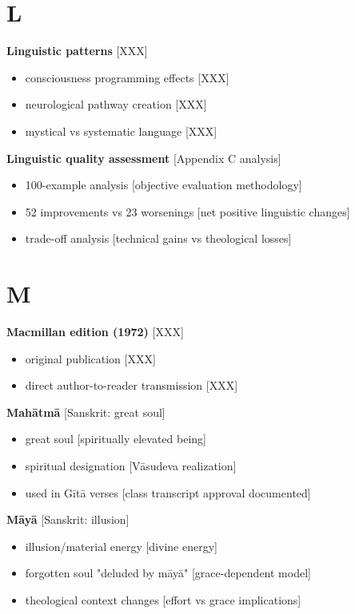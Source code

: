 \documentclass[11pt,twoside]{book}
\begin{document}
\section*{L}
\label{sec:orgada353a}

\textbf{\textbf{Linguistic patterns}} {[}XXX]
\begin{itemize}
\item consciousness programming effects [XXX]
\item neurological pathway creation [XXX]
\item mystical vs systematic language [XXX]
\end{itemize}

\textbf{\textbf{Linguistic quality assessment}} {[}Appendix C analysis]
\begin{itemize}
\item 100-example analysis [objective evaluation methodology]
\item 52 improvements vs 23 worsenings [net positive linguistic changes]
\item trade-off analysis [technical gains vs theological losses]
\end{itemize}
\section*{M}
\label{sec:org7b248fb}

\textbf{\textbf{Macmillan edition (1972)}} {[}XXX]
\begin{itemize}
\item original publication [XXX]
\item direct author-to-reader transmission [XXX]
\end{itemize}

\textbf{\textbf{Mahātmā}} {[}Sanskrit: great soul]
\begin{itemize}
\item great soul [spiritually elevated being]
\item spiritual designation [Vāsudeva realization]
\item used in Gītā verses [class transcript approval documented]
\end{itemize}

\textbf{\textbf{Māyā}} {[}Sanskrit: illusion]
\begin{itemize}
\item illusion/material energy [divine energy]
\item forgotten soul "deluded by māyā" [grace-dependent model]
\item theological context changes [effort vs grace implications]
\end{itemize}
\end{document}
